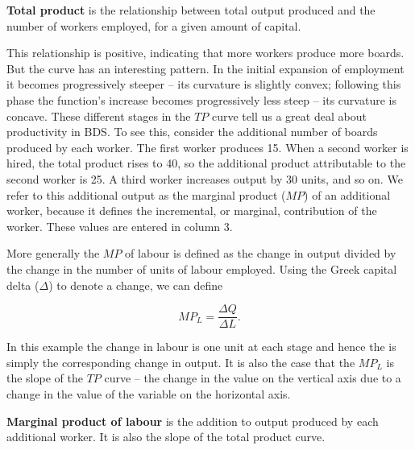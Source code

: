 

\begin{DefBox}
\textbf{Total product} is the relationship between total output produced and the number of workers employed, for a given amount of capital.
\end{DefBox}

This relationship is positive, indicating that more workers produce more boards. But the curve has an interesting pattern. In the initial expansion of employment it becomes progressively steeper -- its curvature is slightly convex; following this phase the function's increase becomes progressively less steep -- its curvature is concave. These different stages in the $TP$ curve tell us a great deal about productivity in BDS. To see this, consider the additional number of boards produced by each worker. The first worker produces 15. When a second worker is hired, the total product rises to 40, so the additional product attributable to the second worker is 25. A third worker increases output by 30 units, and so on. We refer to this additional output as the marginal product ($MP$) of an additional worker, because it defines the incremental, or marginal, contribution of the worker. These values are entered in column 3.

More generally the $MP$ of labour is defined as the change in output divided by the change in the number of units of labour employed. Using the Greek capital delta ($\Delta$) to denote a change, we can define

\begin{equation*}
MP_L=\frac{\Delta Q}{\Delta L}.
\end{equation*}

In this example the change in labour is one unit at each stage and hence the  is simply the corresponding change in output. It is also the case that the $MP_L$ is the slope of the $TP$ curve -- the change in the value on the vertical axis due to a change in the value of the variable on the horizontal axis.

\begin{DefBox}
\textbf{Marginal product of labour} is the addition to output produced by each additional worker. It is also the slope of the total product curve.
\end{DefBox}

